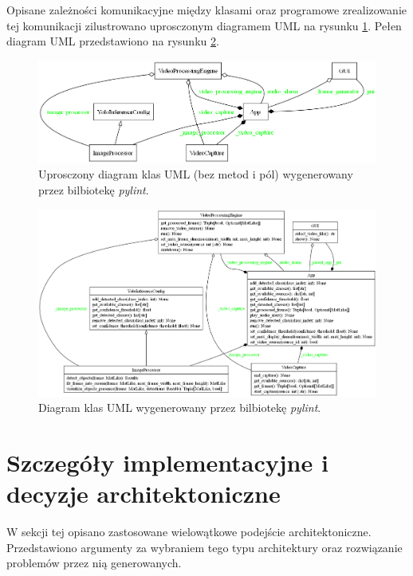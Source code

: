 Opisane zależności komunikacyjne między klasami oraz programowe zrealizowanie tej komunikacji zilustrowano uprosczonym diagramem UML na rysunku \ref{fig:uprosczony-diagram-klas}. Pełen diagram UML przedstawiono na rysunku \ref{fig:diagram-klas}. 

\begin{figure}[H]
    \centering
    \includegraphics[width=\linewidth]{r_implementacja/klasy/simplified_classes.png}
    \caption{Uprosczony diagram klas UML (bez metod i pól) wygenerowany przez bilbiotekę \emph{pylint}.}
    \label{fig:uprosczony-diagram-klas}
\end{figure}


\begin{figure}[H]
    \centering
    \includegraphics[angle=270, scale = 0.5]{r_implementacja/klasy/classes_MyProject.png}
    \caption{Diagram klas UML wygenerowany przez bilbiotekę \emph{pylint}.}
    \label{fig:diagram-klas}
\end{figure}


\section{Szczegóły implementacyjne i decyzje architektoniczne}
W sekcji tej opisano zastosowane wielowątkowe podejście architektoniczne. Przedstawiono argumenty za wybraniem tego typu architektury oraz rozwiązanie problemów przez nią generowanych. 

